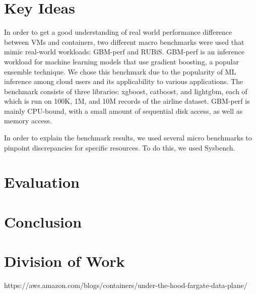 \documentclass[11pt]{article}
\begin{document}
\section{Key Ideas}

In order to get a good understanding of real world performance difference between VMs and containers, two different macro benchmarks were used that mimic real-world workloads: GBM-perf and RUBiS. GBM-perf is an inference workload for machine learning models that use gradient boosting, a popular ensemble technique. We chose this benchmark due to the popularity of ML inference among cloud users and its applicability to various applications. The benchmark consists of three libraries: xgboost, catboost, and lightgbm, each of which is run on 100K, 1M, and 10M records of the airline dataset. GBM-perf is mainly CPU-bound, with a small amount of sequential disk access, as well as memory access.

In order to explain the benchmark results, we used several micro benchmarks to pinpoint discrepancies for specific resources. To do this, we used Sysbench. 

\section{Evaluation}


\section{Conclusion}


\section{Division of Work}



https://aws.amazon.com/blogs/containers/under-the-hood-fargate-data-plane/
\end{document}

